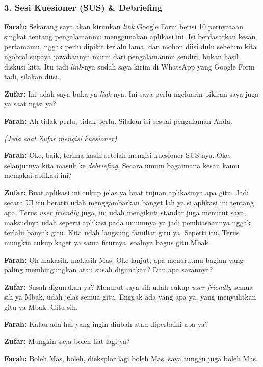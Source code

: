 \bigskip

\subsubsection*{3. Sesi Kuesioner (SUS) \& Debriefing}

\textbf{Farah:} Sekarang saya akan kirimkan \textit{link} Google Form berisi 10 pernyataan singkat tentang pengalamanmu menggunakan aplikasi ini. Isi berdasarkan kesan pertamamu, nggak perlu dipikir terlalu lama, dan mohon diisi dulu sebelum kita ngobrol supaya jawabannya murni dari pengalamanmu sendiri, bukan hasil diskusi kita. Itu tadi \textit{link}-nya sudah saya kirim di WhatsApp yang Google Form tadi, silakan diisi.

\textbf{Zufar:} Ini udah saya buka ya \textit{link}-nya. Ini saya perlu ngeluarin pikiran saya juga ya saat ngisi ya?

\textbf{Farah:} Ah tidak perlu, tidak perlu. Silakan isi sesuai pengalaman Anda.

\textit{(Jeda saat Zufar mengisi kuesioner)}

\textbf{Farah:} Oke, baik, terima kasih setelah mengisi kuesioner SUS-nya. Oke, selanjutnya kita masuk ke \textit{debriefing}. Secara umum bagaimana kesan kamu memakai aplikasi ini?

\textbf{Zufar:} Buat aplikasi ini cukup jelas ya buat tujuan aplikasinya apa gitu. Jadi secara UI itu berarti udah menggambarkan banget lah ya si aplikasi ini tentang apa. Terus \textit{user friendly} juga, ini udah mengikuti standar juga menurut saya, maksudnya udah seperti aplikasi pada umumnya ya jadi pembiasaannya nggak terlalu banyak gitu. Kita udah langsung familiar gitu ya. Seperti itu. Terus mungkin cukup kaget ya sama fiturnya, soalnya bagus gitu Mbak.

\textbf{Farah:} Oh makasih, makasih Mas. Oke lanjut, apa menurutmu bagian yang paling membingungkan atau susah digunakan? Dan apa sarannya?

\textbf{Zufar:} Susah digunakan ya? Menurut saya sih udah cukup \textit{user friendly} semua sih ya Mbak, udah jelas semua gitu. Enggak ada yang apa ya, yang menyulitkan gitu ya Mbak. Gitu sih.

\textbf{Farah:} Kalau ada hal yang ingin diubah atau diperbaiki apa ya?

\textbf{Zufar:} Mungkin saya boleh liat lagi ya?

\textbf{Farah:} Boleh Mas, boleh, dieksplor lagi boleh Mas, saya tunggu juga boleh Mas.

